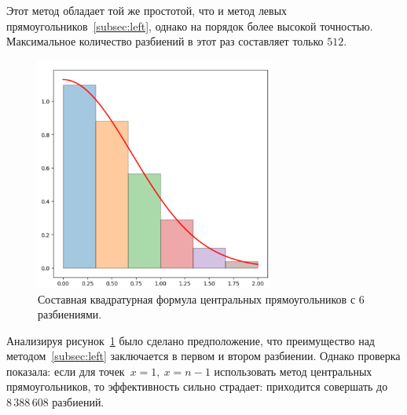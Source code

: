 \documentclass[a4paper, 14pt]{extarticle}
\begin{document}
    Этот метод обладает той же простотой, что и метод левых прямоугольников~\ref{subsec:left},
    однако на порядок более высокой точностью.
    Максимальное количество разбиений в этот раз составляет только $512$.

    \begin{figure}[H]
        \centering
        \includegraphics[width=0.7\textwidth]{img/center}
        \caption{Составная квадратурная формула центральных прямоугольников с 6 разбиениями.}
        \label{fig:Centre_Rectangles}
    \end{figure}

    Анализируя рисунок~\ref{fig:Centre_Rectangles} было сделано предположение,
    что преимущество над методом~\ref{subsec:left} заключается в первом и втором разбиении.
    Однако проверка показала: если для точек~$x=1,~x=n-1$ использовать метод центральных прямоугольников, то
    эффективность сильно страдает: приходится совершать до~$8\,388\,608$ разбиений.
\end{document}

